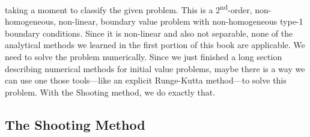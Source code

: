  taking a moment to classify the given problem.  This is a 2\textsuperscript{nd}-order, non-homogeneous, non-linear, boundary value problem with non-homogeneous type-1 boundary conditions.  Since it is non-linear and also not separable, none of the analytical methods we learned in the first portion of this book are applicable.  We need to solve the problem numerically.  Since we just finished a long section describing numerical methods for initial value problems, maybe there is a way we can use one those tools---like an explicit Runge-Kutta method---to solve this problem.  With the Shooting method, we do exactly that.

\subsection{The Shooting Method}



